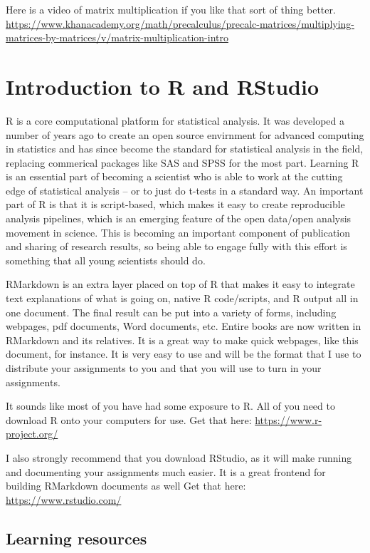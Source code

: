 \documentclass[
]{book}
\begin{document}
Here is a video of matrix multiplication if you like that sort of thing better.
\url{https://www.khanacademy.org/math/precalculus/precalc-matrices/multiplying-matrices-by-matrices/v/matrix-multiplication-intro}

\hypertarget{introduction-to-r-and-rstudio-1}{%
\section{Introduction to R and RStudio}\label{introduction-to-r-and-rstudio-1}}

R is a core computational platform for statistical analysis. It was developed a number of years ago to create an open source envirnment for advanced computing in statistics and has since become the standard for statistical analysis in the field, replacing commerical packages like SAS and SPSS for the most part. Learning R is an essential part of becoming a scientist who is able to work at the cutting edge of statistical analysis -- or to just do t-tests in a standard way. An important part of R is that it is script-based, which makes it easy to create reproducible analysis pipelines, which is an emerging feature of the open data/open analysis movement in science. This is becoming an important component of publication and sharing of research results, so being able to engage fully with this effort is something that all young scientists should do.

RMarkdown is an extra layer placed on top of R that makes it easy to integrate text explanations of what is going on, native R code/scripts, and R output all in one document. The final result can be put into a variety of forms, including webpages, pdf documents, Word documents, etc. Entire books are now written in RMarkdown and its relatives. It is a great way to make quick webpages, like this document, for instance. It is very easy to use and will be the format that I use to distribute your assignments to you and that you will use to turn in your assignments.

It sounds like most of you have had some exposure to R. All of you need to download R onto your computers for use. Get that here:
\url{https://www.r-project.org/}

I also strongly recommend that you download RStudio, as it will make running and documenting your assignments much easier. It is a great frontend for building RMarkdown documents as well Get that here:
\url{https://www.rstudio.com/}

\hypertarget{learning-resources-1}{%
\subsection{Learning resources}\label{learning-resources-1}}
\end{document}
